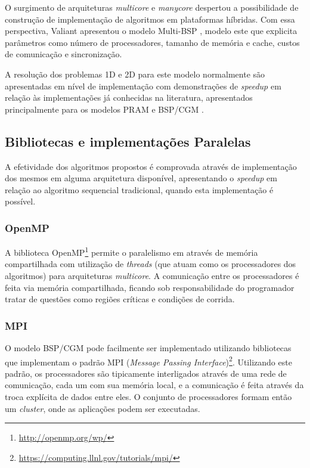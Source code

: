 \documentclass[a4paper, 12pt] {article}
\begin{document}
O surgimento de arquiteturas \textit{multicore} e \textit{manycore} despertou a
possibilidade de construção de implementação de algoritmos em plataformas
híbridas. Com essa perspectiva, Valiant apresentou o modelo Multi-BSP
\cite{Valiant:2008:BMM:1431008.1431011}, modelo este que explicita parâmetros
como número de processadores, tamanho de memória e cache, custos de comunicação
e sincronização.

A resolução dos problemas 1D e 2D para este modelo normalmente são apresentadas
em nível de implementação com demonstrações de \textit{speedup} em relação às
implementações já conhecidas na literatura, apresentados principalmente para os
modelos PRAM e BSP/CGM \cite{6473291,doi:10.1117/12.928318,takaoka2014efficient}.

\subsection{Bibliotecas e implementações Paralelas}

A efetividade dos algoritmos propostos é comprovada através de implementação dos
mesmos em alguma arquitetura disponível, apresentando o \textit{speedup} em
relação ao algoritmo sequencial tradicional, quando esta implementação é
possível.

\subsubsection{OpenMP}

A biblioteca OpenMP\footnote{\url{http://openmp.org/wp/}} permite o paralelismo
em através de memória compartilhada com utilização de \textit{threads} (que atuam
como os processadores dos algoritmos) para arquiteturas \textit{multicore}. A
comunicação entre os processadores é feita via memória compartilhada, ficando
sob responsabilidade do programador tratar de questões como regiões críticas e
condições de corrida.

\subsubsection{MPI}

O modelo BSP/CGM pode facilmente ser implementado utilizando bibliotecas que
implementam o padrão MPI (\textit{Message Passing
Interface})\footnote{\url{https://computing.llnl.gov/tutorials/mpi/}}.
Utilizando este padrão, os processadores são tipicamente interligados através de uma rede de
comunicação, cada um com sua memória local, e a comunicação é feita através da
troca explícita de dados entre eles. O conjunto de processadores formam então um
\textit{cluster}, onde as aplicações podem ser executadas.
\end{document}

